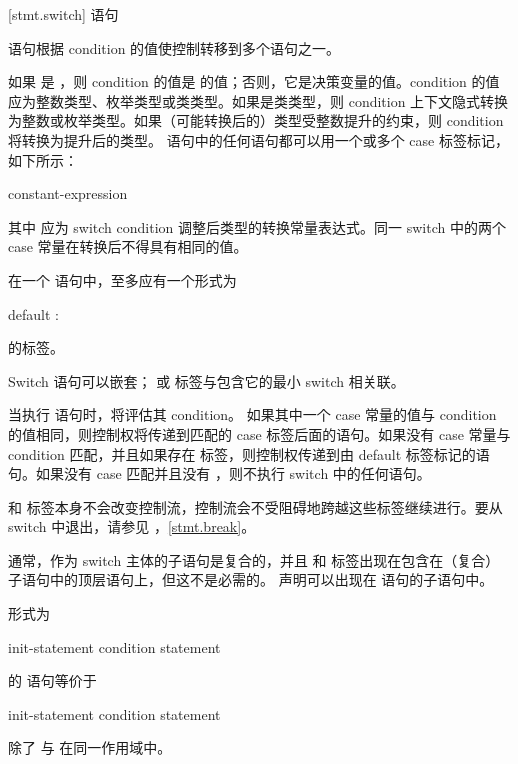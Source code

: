[stmt.switch]{  语句}%

\pnum
{} 语句根据 condition 的值使控制转移到多个语句之一。

\pnum
如果  是 ，则 condition 的值是  的值；否则，它是决策变量的值。condition 的值应为整数类型、枚举类型或类类型。如果是类类型，则 condition 上下文隐式转换为整数或枚举类型。如果（可能转换后的）类型受整数提升的约束，则 condition 将转换为提升后的类型。  语句中的任何语句都可以用一个或多个 case 标签标记，如下所示：
\begin{ncbnf}
%
 constant-expression \terminal{:}
\end{ncbnf}
其中  应为 switch condition 调整后类型的转换常量表达式。同一 switch 中的两个 case 常量在转换后不得具有相同的值。


\pnum
{}%
在一个  语句中，至多应有一个形式为
\begin{codeblock}
default :
\end{codeblock}
的标签。

\pnum
Switch 语句可以嵌套； 或  标签与包含它的最小 switch 相关联。

\pnum
当执行  语句时，将评估其 condition。
%
如果其中一个 case 常量的值与 condition 的值相同，则控制权将传递到匹配的 case 标签后面的语句。如果没有 case 常量与 condition 匹配，并且如果存在
%
 标签，则控制权传递到由 default 标签标记的语句。如果没有 case 匹配并且没有 ，则不执行 switch 中的任何语句。

\pnum
{} 和  标签本身不会改变控制流，控制流会不受阻碍地跨越这些标签继续进行。要从 switch 中退出，请参见 ，\ref{stmt.break}。
\begin{note}
通常，作为 switch 主体的子语句是复合的，并且  和  标签出现在包含在（复合）子语句中的顶层语句上，但这不是必需的。
%
声明可以出现在  语句的子语句中。
\end{note}

\pnum
形式为
\begin{ncsimplebnf}
 \terminal{(} init-statement condition \terminal{)} statement
\end{ncsimplebnf}
的  语句等价于
\begin{ncsimplebnf}
\terminal{\{}\br
\bnfindent init-statement\br
\bnfindent {} \terminal{(} condition \terminal{)} statement\br
\terminal{\}}
\end{ncsimplebnf}
除了  与  在同一作用域中。

